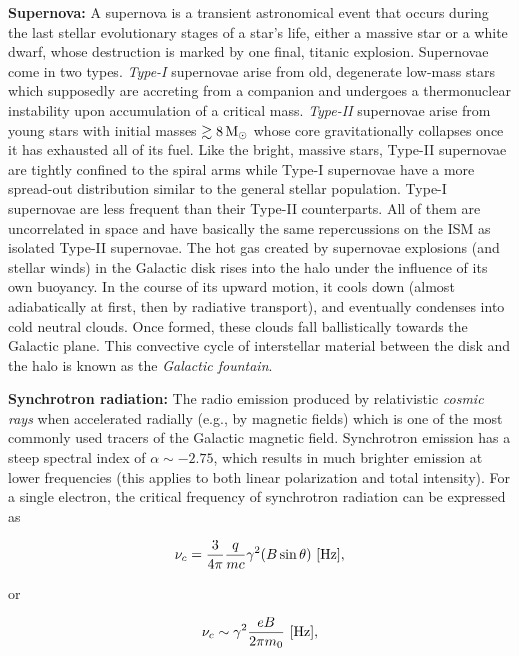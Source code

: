 \documentclass[a4paper,11pt]{article}
\begin{document}
{\noindent}\textbf{Supernova:} A supernova is a transient astronomical event that occurs during the last stellar evolutionary stages of a star's life, either a massive star or a white dwarf, whose destruction is marked by one final, titanic explosion. Supernovae come in two types. \textit{Type-I} supernovae arise from old, degenerate low-mass stars which supposedly are accreting from a companion and undergoes a thermonuclear instability upon accumulation of a critical mass. \textit{Type-II} supernovae arise from young stars with initial masses $\gtrsim8\,{\rm M}_\odot$ whose core gravitationally collapses once it has exhausted all of its fuel. Like the bright, massive stars, Type-II supernovae are tightly confined to the spiral arms while Type-I supernovae have a more spread-out distribution similar to the general stellar population. Type-I supernovae are less frequent than their Type-II counterparts. All of them are uncorrelated in space and have basically the same repercussions on the ISM as isolated Type-II supernovae. The hot gas created by supernovae explosions (and stellar winds) in the Galactic disk rises into the halo under the influence of its own buoyancy. In the course of its upward motion, it cools down (almost adiabatically at first, then by radiative transport), and eventually condenses into cold neutral clouds. Once formed, these clouds fall ballistically towards the Galactic plane. This convective cycle of interstellar material between the disk and the halo is known as the \textit{Galactic fountain}.

{\noindent}\textbf{Synchrotron radiation:} The radio emission produced by relativistic \textit{cosmic rays} when accelerated radially (e.g., by magnetic fields) which is one of the most commonly used tracers of the Galactic magnetic field. Synchrotron emission has a steep spectral index of $\alpha\sim-2.75$, which results in much brighter emission at lower frequencies (this applies to both linear polarization and total intensity). For a single electron, the critical frequency of synchrotron radiation can be expressed as

\begin{align*}
    \nu_c = \dfrac{3}{4\pi}\dfrac{q}{mc}\gamma^2(B\sin\theta)~[{\rm Hz}],
\end{align*}

{\noindent} or

\begin{align*}
\nu_c \sim \gamma^2 \frac{eB}{2\pi m_0} ~ [{\rm Hz}],
\end{align*}
\end{document}
